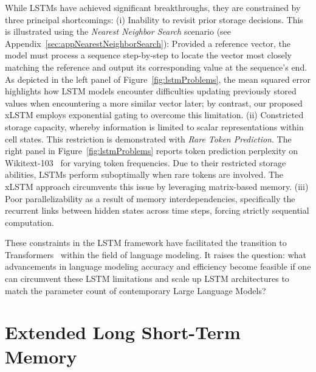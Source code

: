 While LSTMs have achieved significant breakthroughs, they are constrained by three principal shortcomings: (i) Inability to revisit prior storage decisions. This is illustrated using the {\it Nearest Neighbor Search} scenario (see Appendix~\ref{sec:appNearestNeighborSearch}): Provided a reference vector, the model must process a sequence step-by-step to locate the vector most closely matching the reference and output its corresponding value at the sequence’s end. As depicted in the left panel of Figure~\ref{fig:lstmProblems}, the mean squared error highlights how LSTM models encounter difficulties updating previously stored values when encountering a more similar vector later; by contrast, our proposed xLSTM employs exponential gating to overcome this limitation. (ii) Constricted storage capacity, whereby information is limited to scalar representations within cell states. This restriction is demonstrated with {\it Rare Token Prediction}. The right panel in Figure~\ref{fig:lstmProblems} reports token prediction perplexity on Wikitext-103~\citep{Merity:17} for varying token frequencies. Due to their restricted storage abilities, LSTMs perform suboptimally when rare tokens are involved. The xLSTM approach circumvents this issue by leveraging matrix-based memory. (iii) Poor parallelizability as a result of memory interdependencies, specifically the recurrent links between hidden states across time steps, forcing strictly sequential computation.

These constraints in the LSTM framework have facilitated the transition to Transformers~\citep{Vaswani:17} within the field of language modeling. It raises the question: what advancements in language modeling accuracy and efficiency become feasible if one can circumvent these LSTM limitations and scale up LSTM architectures to match the parameter count of contemporary Large Language Models?

\section{Extended Long Short-Term Memory}
\label{sec:xLSTM}

